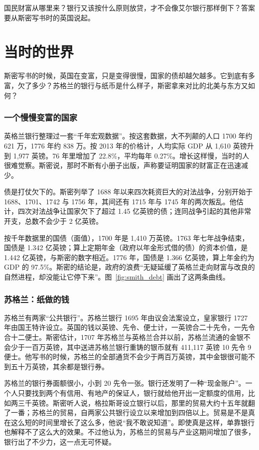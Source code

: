 国民财富从哪里来？银行又该按什么原则放贷，才不会像艾尔银行那样倒下？答案要从斯密写书时的英国说起。

\section{当时的世界}\label{sec:smith-world}

斯密写书的时候，英国在变富，只是变得很慢，国家的债却越欠越多。它到底有多富，欠了多少？苏格兰的银行与纸币是什么样子，斯密拿来对比的北美与东方又如何？

\subsubsection{一个慢慢变富的国家}
英格兰银行整理过一套“千年宏观数据”。按这套数据，大不列颠的人口 1700 年约 621 万，1776 年约 838 万。按 2013 年的价格计，人均实际 GDP 从 1,610 英镑升到 1,977 英镑。76 年里增加了 22.8\%，平均每年 0.27\%\cite{boe2017,broadberry2015}。增长这样慢，当时的人很难觉察。斯密说，那时不断有小册子出版，声称要证明国家的财富正在迅速减少\cite{smith1776}。

债是打仗欠下的。斯密列举了 1688 年以来四次耗资巨大的对法战争，分别开始于 1688、1701、1742 与 1756 年，其间还有 1715 年与 1745 年的两次叛乱。他估计，四次对法战争让国家欠下了超过 1.45 亿英镑的债；连同战争引起的其他非常开支，总数不会少于 2 亿英镑\cite{smith1776}。

按千年数据里的国债（面值），1700 年是 1,410 万英镑。1763 年七年战争结束\cite{rockoff2009}，国债是 1.342 亿英镑；算上定期年金（政府以年金形式借的债）的资本价值，是 1.442 亿英镑，与斯密的数字相近。1776 年，国债是 1.366 亿英镑，算上年金约为 GDP 的 97.5\%\cite{boe2017,mitchell1988}。斯密的结论是，政府的浪费“无疑延缓了英格兰走向财富与改良的自然进程，却没能让它停下来”\cite{smith1776}。图~\ref{fig:smith_debt} 画出了这两条曲线。

\subsubsection{苏格兰：纸做的钱}
苏格兰有两家“公共银行”。苏格兰银行 1695 年由议会法案设立，皇家银行 1727 年由国王特许设立\cite{smith1776}。英国的钱以英镑、先令、便士计，一英镑合二十先令，一先令合十二便士。斯密估计，1707 年苏格兰与英格兰合并以前，苏格兰流通的金银不会少于一百万英镑，其中送进苏格兰银行重铸的银币就有 411,117 英镑 10 先令 9 便士。他写书的时候，苏格兰的全部通货不会少于两百万英镑，其中金银很可能不到五十万英镑，其余都是银行券\cite{smith1776}。

苏格兰的银行券面额很小，小到 20 先令一张。银行还发明了一种“现金账户”。一个人只要找到两个有信用、有地产的保证人，银行就给他开出一定额度的信用，比如两三千英镑\cite{smith1776}。斯密听人说，格拉斯哥设立银行以后，那里的贸易大约十五年就翻了一番；苏格兰的贸易，自两家公共银行设立以来增加到四倍以上。贸易是不是真在这么短的时间里增长了这么多，他说“我不敢说知道”。即使真是这样，单靠银行也解释不了这么大的效果。不过他认为，苏格兰的贸易与产业这期间增加了很多，银行出了不少力，这一点无可怀疑\cite{smith1776}。

